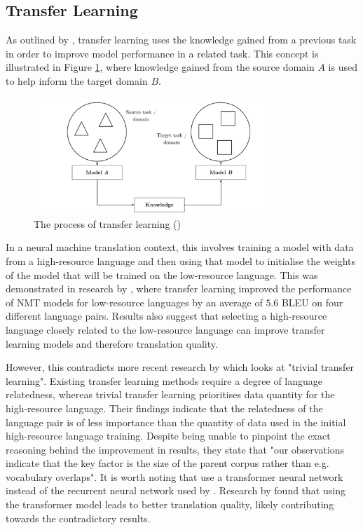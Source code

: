 \subsection{Transfer Learning}
\label{sec:2-transfer_learning}
As outlined by \cite{torrey_transfer_2009}, transfer learning uses the knowledge gained from a previous task in order to improve model performance in a related task. This concept is illustrated in Figure \ref{fig:transfer}, where knowledge gained from the source domain $A$ is used to help inform the target domain $B$.

\begin{figure}[ht!]
\centering
\includegraphics[width=0.8\textwidth]{media/literature/nmt_approaches/transfer.png}
\caption[The process of transfer learning]{The process of transfer learning (\cite{ruder_transfer_2019})}
\label{fig:transfer}
\end{figure}


In a neural machine translation context, this involves training a model with data from a high-resource language and then using that model to initialise the weights of the model that will be trained on the low-resource language.
This was demonstrated in research by \cite{zoph_transfer_2016}, where transfer learning improved the performance of \acrshort{NMT} models for low-resource languages by an average of $5.6$ \acrshort{BLEU} on four different language pairs. Results also suggest that selecting a high-resource language closely related to the low-resource language can improve transfer learning models and therefore translation quality.

However, this contradicts more recent research by \cite{kocmi_trivial_2018} which looks at "trivial transfer learning". Existing transfer learning methods require a degree of language relatedness, whereas trivial transfer learning prioritises data quantity for the high-resource language. Their findings indicate that the relatedness of the language pair is of less importance than the quantity of data used in the initial high-resource language training. Despite being unable to pinpoint the exact reasoning behind the improvement in results, they state that "our observations indicate that the key factor is the size of the parent corpus rather than e.g. vocabulary overlaps".
It is worth noting that \cite{kocmi_trivial_2018} use a transformer neural network instead of the recurrent neural network used by \cite{zoph_transfer_2016}. Research by \cite{popel_training_2018} found that using the transformer model leads to better translation quality, likely contributing towards the contradictory results.


